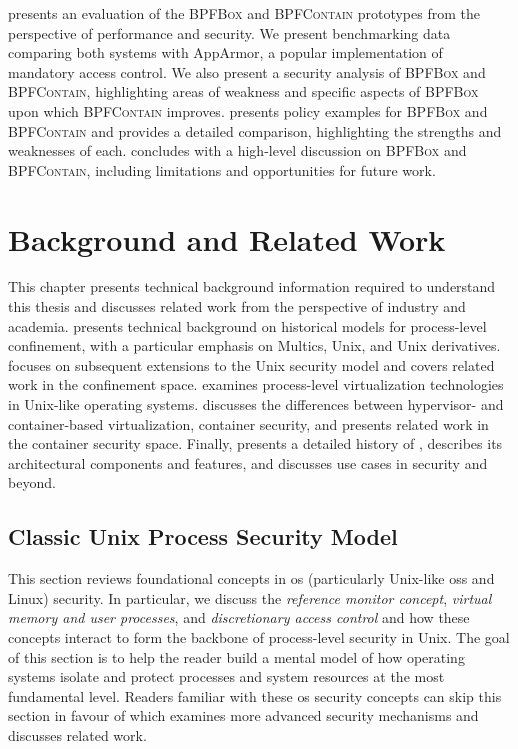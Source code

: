 \documentclass[
  fontsize=12pt,
  titlepage=firstiscover,
  paper=letter,
oneside,
  cleardoublepage=plain,
  parskip=half-,
  DIV=10,
  parindent,
  appendixprefix,
  chapterprefix,
  listof=totoc,
]{scrbook}
\newcommand{\bpfbox}{\textsc{BPFBox}}
\newcommand{\bpfcontain}{\textsc{BPFContain}}
\begin{document}
 presents an evaluation of the \bpfbox{} and \bpfcontain{} prototypes
from the perspective of performance and security. We present benchmarking data comparing
both systems with AppArmor, a popular  implementation of mandatory
access control. We also present a security analysis of \bpfbox{} and \bpfcontain{},
highlighting areas of weakness and specific aspects of \bpfbox{} upon which \bpfcontain{}
improves.   presents policy examples for \bpfbox{} and \bpfcontain{}
and provides a detailed comparison, highlighting the strengths and weaknesses of each.
 concludes with a high-level discussion on \bpfbox{} and \bpfcontain{},
including limitations and opportunities for future work.


\chapter{Background and Related Work}\label{c:background}
This chapter presents technical background information required to understand this thesis
and discusses related work from the perspective of industry and academia.
 presents technical background on historical models for
process-level confinement, with a particular emphasis on Multics, Unix, and Unix
derivatives.   focuses on subsequent extensions to the Unix
security model and covers related work in the confinement space. 
examines process-level virtualization technologies in Unix-like operating systems.
 discusses the differences between hypervisor- and container-based
virtualization, container security, and presents related work in the container security
space. Finally,  presents a detailed history of ,
describes its architectural components and features, and discusses use cases in security
and beyond.

\section{Classic Unix Process Security Model}\label{s:process-security-model}

This section reviews foundational concepts in \gls{os} (particularly Unix-like \gls{os}s
and Linux) security. In particular, we discuss the \textit{reference monitor concept},
\textit{virtual memory and user processes}, and \textit{discretionary access control} and
how these concepts interact to form the backbone of process-level security in Unix.  The
goal of this section is to help the reader build a mental model of how operating systems
isolate and protect processes and system resources at the most fundamental level. Readers
familiar with these \gls{os} security concepts can skip this section in favour of
 which examines more advanced security mechanisms and
discusses related work.
\end{document}

